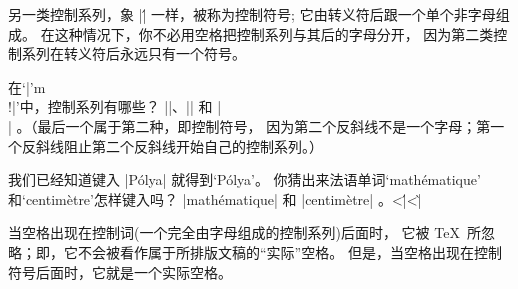 另一类控制系列，象 |\'| 一样，被称为{控制符号};
它由转义符后跟一个单个{非字母}组成。%
在这种情况下，你不必用空格把控制系列与其后的字母分开，
因为第二类控制系列在转义符后永远只有一个符号。

\exercise 在`|\I'm \\!|'中，控制系列有哪些？
\answer |\I|、|\exercise| 和 |\\| 。（最后一个属于第二种，即控制符号，
因为第二个反斜线不是一个字母；第一个反斜线阻止第二个反斜线开始自己的控制系列。）

\exercise \1我们已经知道键入 |P\'olya| 就得到`P\'olya'。%
你猜出来法语单词`math\'ematique' 和`centim\`etre'怎样键入吗？
\answer |math\'ematique| 和 |centim\`etre| 。^^|\'|^^|\`|

当空格出现在控制词(一个完全由字母组成的控制系列)后面时，
它被 \TeX\ 所忽略；即，它不会被看作属于所排版文稿的``实际''空格。%
但是，当空格出现在控制符号后面时，它就是一个实际空格。

